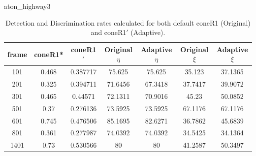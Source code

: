 \begin{appendices}
\begin{table}
\centering
\caption{aton\_highway3}
\begin{tabular}{ |c|c|c|c|c|c|c| }
\hline
\textbf{frame} &  \textbf{coneR1*} &  \textbf{coneR1$'$} &  \textbf{Original $\eta$} &  \textbf{Adaptive $\eta$} &  \textbf{Original $\xi$} &  \textbf{Adaptive $\xi$} \\
\hline
101 &  0.468 &  0.387717 &  75.625 &  75.625 &  35.123 &  37.1365 \\
\hline
201 &  0.325 &  0.394711 &  71.6456 &  67.3418 &  37.7417 &  39.9072 \\
\hline
301 &  0.465 &  0.44571 &  72.1311 &  70.9016 &  45.23 &  50.0852 \\
\hline
501 &  0.37 &  0.276136 &  73.5925 &  73.5925 &  67.1176 &  67.1176 \\
\hline
601 &  0.745 &  0.476506 &  85.1695 &  82.6271 &  36.7862 &  45.6839 \\
\hline
801 &  0.361 &  0.277987 &  74.0392 &  74.0392 &  34.5425 &  34.1364 \\
\hline
1401 &  0.73 &  0.530566 &  80 &  80 &  41.2587 &  50.3497 \\
\hline

\end{tabular}
\caption*{Detection and Discrimination rates calculated for both default coneR1 (Original) and coneR1$'$ (Adaptive).}
\end{table}


\end{appendices}
